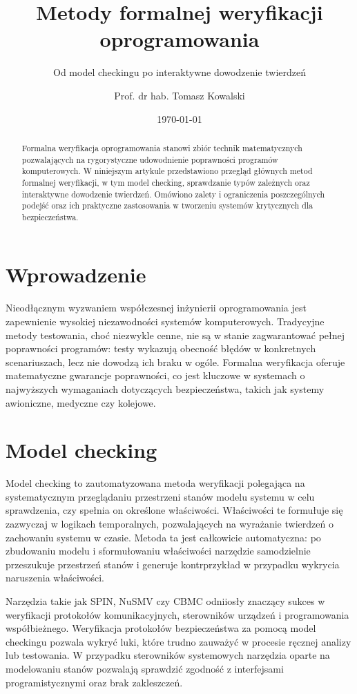\documentclass[
    language=polish,
    doctype=article,
]{../../omnilatex}
\title{Metody formalnej weryfikacji oprogramowania}
\subtitle{Od model checkingu po interaktywne dowodzenie twierdzeń}
\author{Prof. dr hab. Tomasz Kowalski}
\date{\today}
\begin{document}
\maketitle

\begin{abstract}
Formalna weryfikacja oprogramowania stanowi zbiór technik matematycznych pozwalających na rygorystyczne udowodnienie poprawności programów komputerowych. W niniejszym artykule przedstawiono przegląd głównych metod formalnej weryfikacji, w tym model checking, sprawdzanie typów zależnych oraz interaktywne dowodzenie twierdzeń. Omówiono zalety i ograniczenia poszczególnych podejść oraz ich praktyczne zastosowania w tworzeniu systemów krytycznych dla bezpieczeństwa.
\end{abstract}

\section{Wprowadzenie}
Nieodłącznym wyzwaniem współczesnej inżynierii oprogramowania jest zapewnienie wysokiej niezawodności systemów komputerowych. Tradycyjne metody testowania, choć niezwykle cenne, nie są w stanie zagwarantować pełnej poprawności programów: testy wykazują obecność błędów w konkretnych scenariuszach, lecz nie dowodzą ich braku w ogóle. Formalna weryfikacja oferuje matematyczne gwarancje poprawności, co jest kluczowe w systemach o najwyższych wymaganiach dotyczących bezpieczeństwa, takich jak systemy awioniczne, medyczne czy kolejowe.

\section{Model checking}
Model checking to zautomatyzowana metoda weryfikacji polegająca na systematycznym przeglądaniu przestrzeni stanów modelu systemu w celu sprawdzenia, czy spełnia on określone właściwości. Właściwości te formułuje się zazwyczaj w logikach temporalnych, pozwalających na wyrażanie twierdzeń o zachowaniu systemu w czasie. Metoda ta jest całkowicie automatyczna: po zbudowaniu modelu i sformułowaniu właściwości narzędzie samodzielnie przeszukuje przestrzeń stanów i generuje kontrprzykład w przypadku wykrycia naruszenia właściwości.

Narzędzia takie jak SPIN, NuSMV czy CBMC odniiosły znaczący sukces w weryfikacji protokołów komunikacyjnych, sterowników urządzeń i programowania współbieżnego. Weryfikacja protokołów bezpieczeństwa za pomocą model checkingu pozwala wykryć luki, które trudno zauważyć w procesie ręcznej analizy lub testowania. W przypadku sterowników systemowych narzędzia oparte na modelowaniu stanów pozwalają sprawdzić zgodność z interfejsami programistycznymi oraz brak zakleszczeń.
\end{document}
